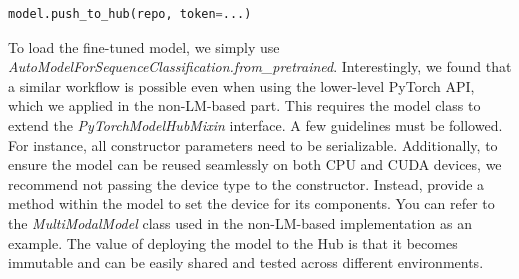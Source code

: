 \documentclass[11pt]{article}
\begin{document}
	\small
	\begin{lstlisting}[language=python]
model.push_to_hub(repo, token=...)
	\end{lstlisting}
	\normalsize
To load the fine-tuned model, we simply use \emph{AutoModelForSequenceClassification.from\_pretrained}. \newline Interestingly, we found that a similar workflow is possible even when using the lower-level PyTorch API, which we applied in the non-LM-based part. This requires the model class to extend the \emph{PyTorchModelHubMixin} interface. \newline A few guidelines must be followed. For instance, all constructor parameters need to be serializable. Additionally, to ensure the model can be reused seamlessly on both CPU and CUDA devices, we recommend not passing the device type to the constructor. Instead, provide a method within the model to set the device for its components. You can refer to the  \emph{MultiModalModel} class used in the non-LM-based implementation as an example. \newline The value of deploying the model to the Hub is that it becomes immutable and can be easily shared and tested across different environments.
	
\end{document}
